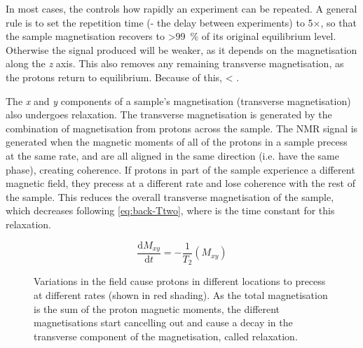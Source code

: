 In most cases, the \Tone controls how rapidly an experiment can be repeated.
A general rule is to set the repetition time (\TR - the delay between experiments) to 5$\times$\Tone, so that the sample magnetisation recovers to \SI{>99}{\percent} of its original equilibrium level.
Otherwise the signal produced will be weaker, as it depends on the magnetisation along the \textit{z} axis.
This also removes any remaining transverse magnetisation, as the protons return to equilibrium.
Because of this, \Ttwo < \Tone.

The \textit{x} and \textit{y} components of a sample's magnetisation (transverse magnetisation) also undergoes relaxation.
The transverse magnetisation is generated by the combination of magnetisation from protons across the sample.
The NMR signal is generated when the magnetic moments of all of the protons in a sample precess at the same rate, and are all aligned in the same direction (i.e. have the same phase), creating coherence.
If protons in part of the sample experience a different magnetic field, they precess at a different rate and lose coherence with the rest of the sample.
This reduces the overall transverse magnetisation of the sample, which decreases following \autoref{eq:back-Ttwo}, where \Ttwo is the time constant for this relaxation.

\begin{equation}
\frac{\mathrm{d}M_{xy}}{\mathrm{d}t} = - \frac{1}{T_2} (M_{xy})
\label{eq:back-Ttwo}
\end{equation}

\begin{figure}[t]
\centering
{}
\caption[Transverse relaxation]{Variations in the \Bzero field cause protons in different locations to precess at different rates (shown in red shading). As the total magnetisation is the sum of the proton magnetic moments, the different magnetisations start cancelling out and cause a decay in the transverse component of the magnetisation, called \Ttwo relaxation.}
\label{fig:back-T2}
\end{figure}

